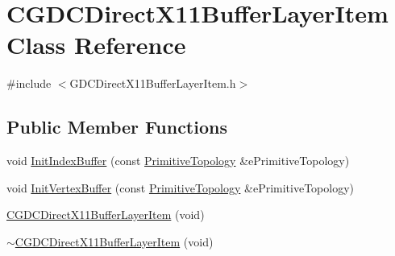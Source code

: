 \hypertarget{class_c_g_d_c_direct_x11_buffer_layer_item}{}\section{C\+G\+D\+C\+Direct\+X11\+Buffer\+Layer\+Item Class Reference}
\label{class_c_g_d_c_direct_x11_buffer_layer_item}


{\ttfamily \#include $<$G\+D\+C\+Direct\+X11\+Buffer\+Layer\+Item.\+h$>$}

\subsection*{Public Member Functions}
\begin{DoxyCompactItemize}
\item 
void \hyperlink{class_c_g_d_c_direct_x11_buffer_layer_item_aca23198b992fe1eecc09114fa53e6aaa}{Init\+Index\+Buffer} (const \hyperlink{_g_types_8h_a940e3da6a9b57aae3de0b050e2a7af5e}{Primitive\+Topology} \&e\+Primitive\+Topology)
\item 
void \hyperlink{class_c_g_d_c_direct_x11_buffer_layer_item_a91bee946d2358a9898a085d377babfe5}{Init\+Vertex\+Buffer} (const \hyperlink{_g_types_8h_a940e3da6a9b57aae3de0b050e2a7af5e}{Primitive\+Topology} \&e\+Primitive\+Topology)
\item 
\hyperlink{class_c_g_d_c_direct_x11_buffer_layer_item_a4d3717fab3a24d63d4da7df07a5ccac1}{C\+G\+D\+C\+Direct\+X11\+Buffer\+Layer\+Item} (void)
\item 
\hyperlink{class_c_g_d_c_direct_x11_buffer_layer_item_ad3a3a0ae864bad7113ae153a192dcaea}{$\sim$\+C\+G\+D\+C\+Direct\+X11\+Buffer\+Layer\+Item} (void)
\end{DoxyCompactItemize}
